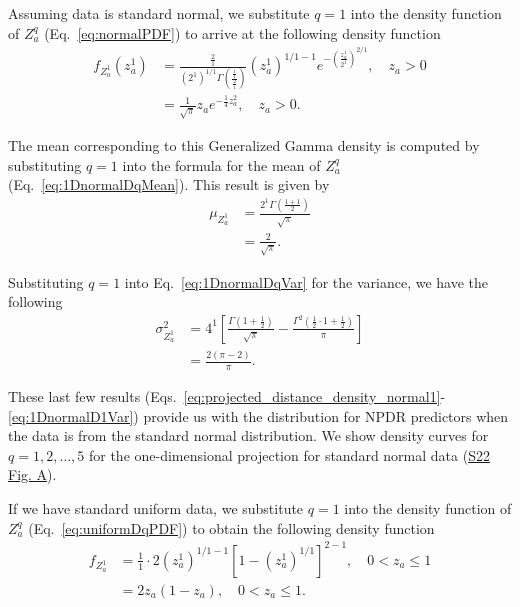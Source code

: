 \documentclass[10pt,letterpaper]{article}
\begin{document}
Assuming data is standard normal, we substitute $q=1$ into the density function of $Z^q_a$ (Eq.~\ref{eq:normalPDF}) to arrive at the following density function
%
\begin{equation}\label{eq:projected_distance_density_normal1}
\begin{aligned}
f_{Z^1_a}\left(z^1_a\right) &= \frac{\frac{2}{1}}{\left(2^1\right)^{1/1}\Gamma\left(\frac{\frac{1}{1}}{\frac{2}{1}}\right)}\left(z^1_a\right)^{1/1 - 1} e^{-\left(\frac{z^1_a}{2^1}\right)^{2/1}}, \quad z_a > 0\\
&= \frac{1}{\sqrt{\pi}} z_a e^{-\frac{1}{4}z^2_a}, \quad z_a > 0.
\end{aligned}
\end{equation}

The mean corresponding to this Generalized Gamma density is computed by substituting $q=1$ into the formula for the mean of $Z^q_a$ (Eq.~\ref{eq:1DnormalDqMean}). This result is given by
%
\begin{equation}\label{eq:1DnormalD1Mean}
\begin{aligned}
\mu_{Z^1_a} &= \frac{2^1 \Gamma\left(\frac{1 + 1}{2}\right)}{\sqrt{\pi}} \\
&= \frac{2}{\sqrt{\pi}}.
\end{aligned}
\end{equation}

Substituting $q=1$ into Eq.~\ref{eq:1DnormalDqVar} for the variance, we have the following
%
\begin{equation}\label{eq:1DnormalD1Var}
\begin{aligned}
\sigma^2_{Z^1_a} &= 4^1\left[\frac{\Gamma\left(1 + \frac{1}{2}\right)}{\sqrt{\pi}} - \frac{\Gamma^2\left(\frac{1}{2}\cdot 1 + \frac{1}{2}\right)}{\pi}\right] \\
&= \frac{2(\pi-2)}{\pi}.
\end{aligned}
\end{equation}

These last few results (Eqs.~\ref{eq:projected_distance_density_normal1}-\ref{eq:1DnormalD1Var}) provide us with the distribution for NPDR predictors when the data is from the standard normal distribution. We show density curves for $q=1,2,\dots,5$ for the one-dimensional projection for standard normal data (\hyperlink{S22_Fig}{S22 Fig. A}).

If we have standard uniform data, we substitute $q=1$ into the density function of $Z^q_a$ (Eq.~\ref{eq:uniformDqPDF}) to obtain the following density function
%
\begin{equation}\label{eq:projected_distance_density_uniform1}
\begin{aligned}
f_{Z^1_a} &= \frac{1}{1}\cdot 2\left(z^1_a\right)^{1/1 - 1}\left[1 - \left(z^1_a\right)^{1/1}\right]^{2-1}, \quad 0 < z_a \leq 1 \\
&= 2z_a(1 - z_a), \quad 0 < z_a \leq 1.
\end{aligned}
\end{equation}
\end{document}
